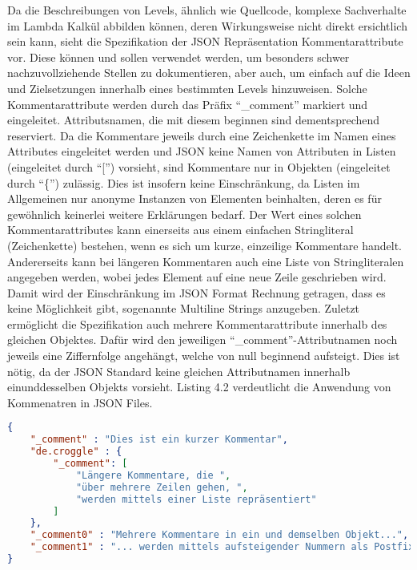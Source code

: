 Da die Beschreibungen von Levels, ähnlich wie Quellcode, komplexe Sachverhalte im Lambda Kalkül abbilden können, deren Wirkungsweise nicht direkt ersichtlich sein kann,
sieht die Spezifikation der JSON Repräsentation Kommentarattribute vor.
Diese können und sollen verwendet werden, um besonders schwer nachzuvollziehende Stellen zu dokumentieren, aber auch, um einfach auf die Ideen und Zielsetzungen innerhalb eines bestimmten Levels hinzuweisen.
Solche Kommentarattribute werden durch das Präfix "`\_comment"' markiert und eingeleitet.
Attributsnamen, die mit diesem beginnen sind dementsprechend reserviert.
Da die Kommentare jeweils durch eine Zeichenkette im Namen eines Attributes eingeleitet werden und JSON keine Namen von Attributen in Listen (eingeleitet durch "`["') vorsieht, sind Kommentare nur in Objekten (eingeleitet durch "`\{"') zulässig.
Dies ist insofern keine Einschränkung, da Listen im Allgemeinen nur anonyme Instanzen von Elementen beinhalten, deren es für gewöhnlich keinerlei weitere Erklärungen bedarf.
Der Wert eines solchen Kommentarattributes kann einerseits aus einem einfachen Stringliteral (Zeichenkette) bestehen, wenn es sich um kurze, einzeilige Kommentare handelt.
Andererseits kann bei längeren Kommentaren auch eine Liste von Stringliteralen angegeben werden, wobei jedes Element auf eine neue Zeile geschrieben wird.
Damit wird der Einschränkung im JSON Format Rechnung getragen, dass es keine Möglichkeit gibt, sogenannte Multiline Strings anzugeben.
Zuletzt ermöglicht die Spezifikation auch mehrere Kommentarattribute innerhalb des gleichen Objektes.
Dafür wird den jeweiligen "`\_comment"'-Attributnamen noch jeweils eine Ziffernfolge angehängt, welche von null beginnend aufsteigt.
Dies ist nötig, da der JSON Standard keine gleichen Attributnamen innerhalb einunddesselben Objekts vorsieht.
Listing 4.2 verdeutlicht die Anwendung von Kommenatren in JSON Files.
\begin{lstlisting}[language=json,caption={Kommentare in einer JSON Datei}]
{
	"_comment" : "Dies ist ein kurzer Kommentar",
	"de.croggle" : {
		"_comment": [
			"Längere Kommentare, die ",
			"über mehrere Zeilen gehen, ",
			"werden mittels einer Liste repräsentiert"
		]
	},
	"_comment0" : "Mehrere Kommentare in ein und demselben Objekt...",
	"_comment1" : "... werden mittels aufsteigender Nummern als Postfix unterschieden"
}
\end{lstlisting}
